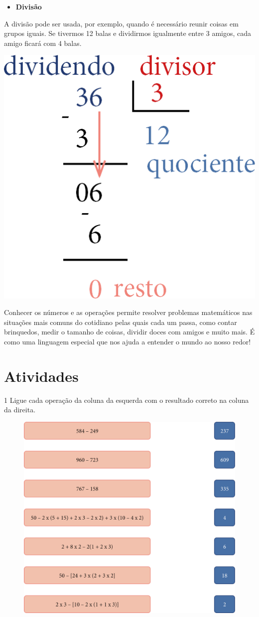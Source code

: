 {\begin{itemize}
\item\textbf{Divisão}
\end{itemize}

A divisão pode ser usada, por exemplo, quando é necessário reunir coisas em grupos iguais. 
Se tivermos 12 balas e dividirmos igualmente entre 3 amigos, cada amigo ficará com 4 balas.\bigskip

\includegraphics[width=.2\textwidth]{media/image13.png}\bigskip

Conhecer os números e as operações permite resolver problemas matemáticos 
nas situações mais comuns do cotidiano pelas quais cada um passa, 
como contar brinquedos, medir o tamanho de coisas, dividir doces com amigos e muito mais. 
É como uma linguagem especial que nos ajuda a entender o mundo ao nosso redor!
}

\section*{Atividades}

\num{1} Ligue cada operação da coluna da esquerda com o resultado correto na
coluna da direita.

\begin{figure}[htpb!]
\centering
\includegraphics[width=.9\textwidth]{media/image14.png}
\end{figure}
\pagebreak


